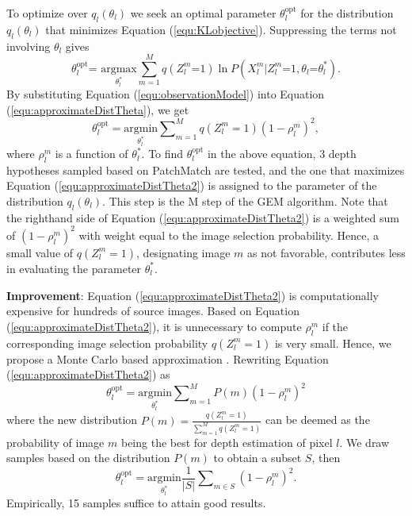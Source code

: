 To optimize over $q_l(\theta_l)$ we seek an optimal parameter $\theta_l^{\text{opt}}$ for the distribution $q_l(\theta_l)$ that minimizes Equation (\ref{equ:KLobjective}). Suppressing the terms  not involving $\theta_l$ gives
\begin{equation}
\theta_l^{\text{opt}} \text{= }  \underset{\theta_l^*}{\text{argmax}} \sum_{m=1}^{M}{q(Z_l^m \text{=}1)\ln{ P(X_l^m|Z_l^m\text{=}1, \theta_l\text{=}\theta^*_l)}}.
\label{equ:approximateDistTheta}
\end{equation}
By substituting Equation (\ref{equ:observationModel}) into Equation (\ref{equ:approximateDistTheta}), we get
\begin{equation}
\theta^{\text{opt}}_l= \underset{\theta^*_l}{\text{argmin}} \sum\nolimits_{m=1}^{M}{q(Z_l^m=1) (1-\rho_l^m)^2 },
\label{equ:approximateDistTheta2}
\end{equation}
where $\rho_l^m$ is a function of $\theta_l^*$. To find $\theta_l^{\text{opt}}$ in the above equation, 3 depth hypotheses sampled based on PatchMatch are tested, and the one that maximizes Equation (\ref{equ:approximateDistTheta2}) is assigned to the parameter of the distribution $q_l(\theta_l)$. This step is the M step of the GEM algorithm.
Note that the righthand side of Equation (\ref{equ:approximateDistTheta2}) is a weighted sum of $(1-\rho_l^m)^2$ with weight equal to the image selection probability. Hence, a small value of $q(Z_l^m=1)$,  designating image $m$ as not favorable, contributes less in evaluating the parameter $\theta_l^*$. %

\textbf{Improvement}: Equation (\ref{equ:approximateDistTheta2}) is computationally expensive for hundreds of source images. Based on Equation (\ref{equ:approximateDistTheta2}), it is unnecessary to compute $\rho_l^m$ if the corresponding image selection probability $q(Z_l^m=1)$ is very small.
Hence, we propose a Monte Carlo  based approximation \cite{BishopBook}. Rewriting Equation (\ref{equ:approximateDistTheta2}) as
\begin{equation}
\theta^{\text{opt}}_l= \underset{\theta^*_l}{\text{argmin}} \sum\nolimits_{m=1}^{M}{ P(m)(1-\rho_l^m)^2 }
\label{equ:approximateDistTheta3}
\end{equation}
where the new distribution $P(m) = \frac{q(Z_l^m=1)}{\sum_{m=1}^M{q(Z_l^m=1)}}$ can be deemed  as the probability of image $m$ being the best for depth estimation of pixel $l$. We draw samples based on the distribution $P(m)$ to obtain a subset $S$, then
\begin{equation}
\theta^{\text{opt}}_l= \underset{\theta^*_l}{\text{argmin}}\frac{1}{|S|}\sum\nolimits_{m\in{ S }}{ (1-\rho_l^m)^2 }.
\label{equ:approximateDistTheta4}
\end{equation}
Empirically, 15 samples  suffice to attain good results.

